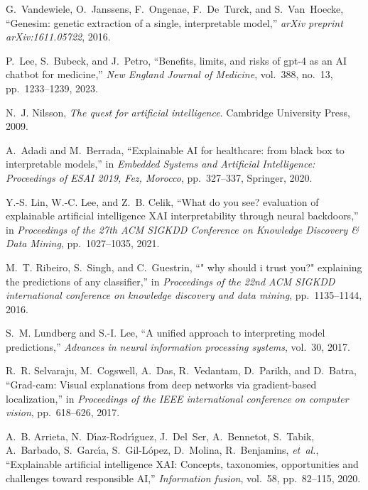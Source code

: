 \documentclass{article}
\begin{document}
\begin{thebibliography}{100}
	G.~Vandewiele, O.~Janssens, F.~Ongenae, F.~De~Turck, and S.~Van~Hoecke,
	``Genesim: genetic extraction of a single, interpretable model,'' {\em arXiv
		preprint arXiv:1611.05722}, 2016.
	
	P.~Lee, S.~Bubeck, and J.~Petro, ``Benefits, limits, and risks of gpt-4 as an
	{AI} chatbot for medicine,'' {\em New England Journal of Medicine}, vol.~388,
	no.~13, pp.~1233--1239, 2023.
	
	N.~J. Nilsson, {\em The quest for artificial intelligence}.
	\newblock Cambridge University Press, 2009.
	
	A.~Adadi and M.~Berrada, ``Explainable {AI} for healthcare: from black box to
	interpretable models,'' in {\em Embedded Systems and Artificial Intelligence:
		Proceedings of ESAI 2019, Fez, Morocco}, pp.~327--337, Springer, 2020.
	
	Y.-S. Lin, W.-C. Lee, and Z.~B. Celik, ``What do you see? evaluation of
	explainable artificial intelligence {XAI} interpretability through neural
	backdoors,'' in {\em Proceedings of the 27th ACM SIGKDD Conference on
		Knowledge Discovery \& Data Mining}, pp.~1027--1035, 2021.
	
	M.~T. Ribeiro, S.~Singh, and C.~Guestrin, ``" why should i trust you?"
	explaining the predictions of any classifier,'' in {\em Proceedings of the
		22nd ACM SIGKDD international conference on knowledge discovery and data
		mining}, pp.~1135--1144, 2016.
	
	S.~M. Lundberg and S.-I. Lee, ``A unified approach to interpreting model
	predictions,'' {\em Advances in neural information processing systems},
	vol.~30, 2017.
	
	R.~R. Selvaraju, M.~Cogswell, A.~Das, R.~Vedantam, D.~Parikh, and D.~Batra,
	``Grad-cam: Visual explanations from deep networks via gradient-based
	localization,'' in {\em Proceedings of the IEEE international conference on
		computer vision}, pp.~618--626, 2017.
	
	A.~B. Arrieta, N.~D{\'\i}az-Rodr{\'\i}guez, J.~Del~Ser, A.~Bennetot, S.~Tabik,
	A.~Barbado, S.~Garc{\'\i}a, S.~Gil-L{\'o}pez, D.~Molina, R.~Benjamins, {\em
		et~al.}, ``Explainable artificial intelligence {XAI}: Concepts, taxonomies,
	opportunities and challenges toward responsible {AI},'' {\em Information
		fusion}, vol.~58, pp.~82--115, 2020.
	

\end{thebibliography}
\end{document}
